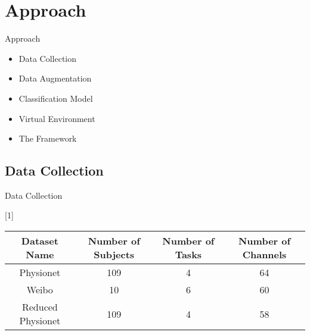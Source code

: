 \section{Approach}
\begin{frame}{Approach}
    \begin{itemize}
        \item Data Collection
        \item Data Augmentation
        \item Classification Model
        \item Virtual Environment
        \item The Framework
    \end{itemize}
\end{frame}

\subsection*{Data Collection}
\begin{frame}{Data Collection}
    \begin{table}[!htbp] 
        \centering 
        \scalebox{.7}[1]{
            \begin{tabular}{|c|c|c|c|} 
                \hline 
                \textbf{Dataset Name} & \textbf{Number of
    Subjects} & \textbf{Number of Tasks} & \textbf{Number of Channels}\\
                \hline
                \hline 
                Physionet & 109 & 4 & 64\\ 
                \hline 
                Weibo & 10 & 6 & 60\\ 
                \hline 
                \hline
                Reduced Physionet & 109 & 4 & 58\\
                \hline 
            \end{tabular} 
        }
    \end{table}
\end{frame}

